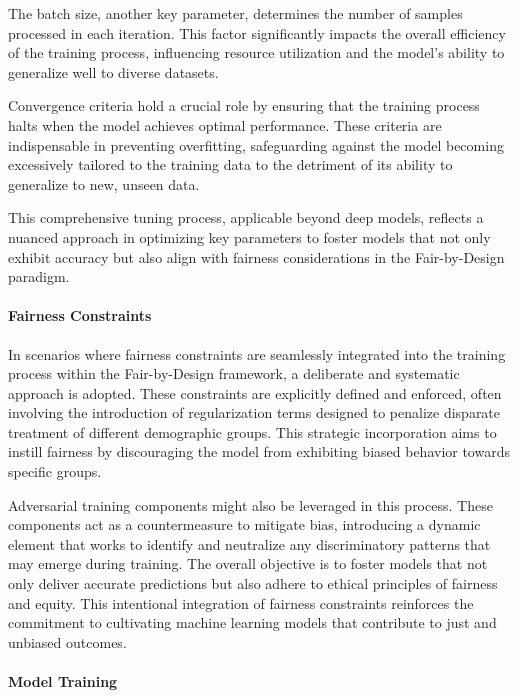 The batch size, another key parameter, determines the number of samples processed in each iteration. This factor significantly impacts the overall efficiency of the training process, influencing resource utilization and the model's ability to generalize well to diverse datasets.

Convergence criteria hold a crucial role by ensuring that the training process halts when the model achieves optimal performance. These criteria are indispensable in preventing overfitting, safeguarding against the model becoming excessively tailored to the training data to the detriment of its ability to generalize to new, unseen data.

This comprehensive tuning process, applicable beyond deep models, reflects a nuanced approach in optimizing key parameters to foster models that not only exhibit accuracy but also align with fairness considerations in the Fair-by-Design paradigm.

\paragraph{Fairness Constraints}

In scenarios where fairness constraints are seamlessly integrated into the training process within the Fair-by-Design framework, a deliberate and systematic approach is adopted. These constraints are explicitly defined and enforced, often involving the introduction of regularization terms designed to penalize disparate treatment of different demographic groups. This strategic incorporation aims to instill fairness by discouraging the model from exhibiting biased behavior towards specific groups.

Adversarial training components might also be leveraged in this process. These components act as a countermeasure to mitigate bias, introducing a dynamic element that works to identify and neutralize any discriminatory patterns that may emerge during training. The overall objective is to foster models that not only deliver accurate predictions but also adhere to ethical principles of fairness and equity. This intentional integration of fairness constraints reinforces the commitment to cultivating machine learning models that contribute to just and unbiased outcomes.

\paragraph{Model Training}

